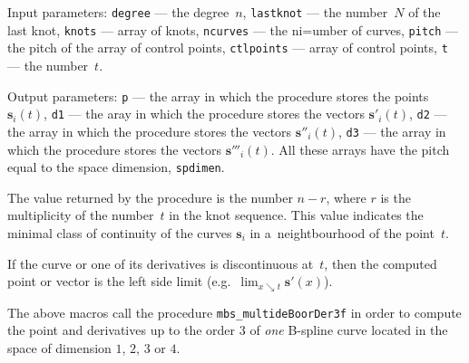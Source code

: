 Input parameters: \texttt{degree} --- the degree~$n$,
\texttt{lastknot} --- the number~$N$ of the last knot,
\texttt{knots} --- array of knots, \texttt{ncurves}
--- the ni=umber of curves, \texttt{pitch} --- the pitch of the array
of control points, \texttt{ctlpoints} --- array of control points,
\texttt{t} --- the number~$t$.

Output parameters: \texttt{p} --- the array in which the procedure stores the
points $\bm{s}_i(t)$, \texttt{d1} --- the aray in which the procedure
stores the vectors $\bm{s}'_i(t)$, \texttt{d2} --- the array in which the
procedure stores the vectors $\bm{s}''_i(t)$, \texttt{d3} --- the array
in which the procedure stores the vectors $\bm{s}'''_i(t)$. All these arrays
have the pitch equal to the space dimension,
\texttt{spdimen}.

The value returned by the procedure is the number $n-r$, where $r$ is the
multiplicity of the number~$t$ in the knot sequence. This value
indicates the minimal class of continuity of the curves
$\bm{s}_i$ in a~neightbourhood of the point~$t$.

If the curve or one of its derivatives is discontinuous at~$t$,
then the computed point or vector is the left side limit
(e.g.\ $\lim_{x\searrow t}\bm{s}'(x)$).


\vspace{\bigskipamount}
\begin{sloppypar}
The above macros call the procedure \texttt{mbs\_multideBoorDer3f} in order
to compute the point and derivatives up to the order $3$ of \emph{one}
B-spline curve located in the space of dimension $1$, $2$, $3$ or $4$.
\end{sloppypar}

